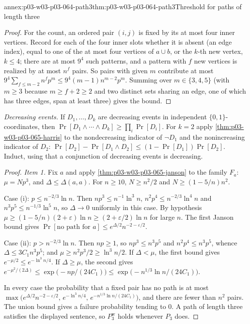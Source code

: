 \begin{annexitem}{annex:p03-w03-p03-064-path3}{thm:p03-w03-p03-064-path3}{Threshold for paths of length three}
\begin{proof}
For the count, an ordered pair \((i,j)\) is fixed by its at most four inner
vertices.  Record for each of the four inner slots whether it is absent (an
edge index), equal to one of the at most four vertices of \(a\cup b\), or the
\(k\)-th new vertex, \(k\leq4\); there are at most \(9^4\) such patterns, and
a pattern with \(f\) new vertices is realized by at most \(n^f\) pairs.  So
pairs with given \(m\) contribute at most \(9^4\sum_{f\leq m-2}n^fp^m\leq
9^4(m-1)n^{m-2}p^m\).  Summing over \(m\in\{3,4,5\}\) (with \(m\geq3\)
because \(m\geq f+2\geq2\) and two distinct sets sharing an edge, one of
which has three edges, span at least three) gives the bound.
\end{proof}

\emph{Decreasing events.}  If \(D_1,\ldots,D_k\) are decreasing events in
independent \(\{0,1\}\)-coordinates, then
\(\Pr[D_1\wedge\cdots\wedge D_k]\geq\prod_i\Pr[D_i]\).  For \(k=2\) apply
\cref{thm:p03-w03-p03-065-harris} to the nondecreasing indicator of
\(\neg D_1\) and the nonincreasing indicator of \(D_2\):
\(\Pr[D_2]-\Pr[D_1\wedge D_2]\leq(1-\Pr[D_1])\Pr[D_2]\).  Induct, using that a
conjunction of decreasing events is decreasing.

\begin{proof}
\emph{Item 1.}  Fix \(a\) and apply \cref{thm:p03-w03-p03-065-janson} to the
family \(F_a\): \(\mu=Np^3\), and \(\Delta\leq\Delta(a,a)\).  For
\(n\geq10\), \(N\geq n^2/2\) and \(N\geq(1-5/n)n^2\).

Case (i): \(p\leq n^{-2/3}\ln n\).  Then
\(np^3\leq n^{-1}\ln^3n\), \(n^2p^4\leq n^{-2/3}\ln^4n\) and
\(n^3p^5\leq n^{-1/3}\ln^5n\), so \(\Delta\to0\) uniformly in this case.
By hypothesis \(\mu\geq(1-5/n)(2+\varepsilon)\ln n\geq(2+\varepsilon/2)\ln n\)
for large \(n\).  The first Janson bound gives
\(\Pr[\text{no path for }a]\leq e^{\Delta/2}n^{-2-\varepsilon/2}\).

Case (ii): \(p>n^{-2/3}\ln n\).  Then \(np\geq1\), so \(np^3\leq n^3p^5\) and
\(n^2p^4\leq n^3p^5\), whence \(\Delta\leq3C_1n^3p^5\); and
\(\mu\geq n^2p^3/2\geq\ln^3n/2\).  If \(\Delta<\mu\), the first bound gives
\(e^{-\mu/2}\leq e^{-\ln^3n/4}\).  If \(\Delta\geq\mu\), the second gives
\(e^{-\mu^2/(2\Delta)}\leq\exp\bigl(-np/(24C_1)\bigr)\leq
\exp\bigl(-n^{1/3}\ln n/(24C_1)\bigr)\).

In every case the probability that a fixed pair has no path is at most
\(\max\bigl(e^{\Delta/2}n^{-2-\varepsilon/2},\,e^{-\ln^3n/4},\,
e^{-n^{1/3}\ln n/(24C_1)}\bigr)\), and there are fewer than \(n^2\) pairs.
The union bound gives a failure probability tending to \(0\).  A path of
length three satisfies the displayed sentence, so \(P_3^{\mathrm w}\) holds
whenever \(P_3\) does.


\end{proof}
\end{annexitem}
